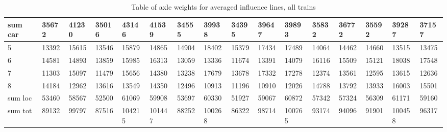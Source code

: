 \begin{table}[h]
\begin{adjustbox}{center}
\begin{tabularx}{0.95\pagewidth}{ |X|X|X|X|X|X|X|X|X|X|X|X|X|X|X|X| }
      \hline
      sum car  & 35672   &   41230   &    35016   &    43146   &    41539    &   34555  &     39938    &   34395   &    39647   &    39893   &    35832   &    36772    &   35592   &   39287    &    37157  \\
      \hline
      5 & 13392   &   15615   &    13546   &    15879   &    14865    &   14904  &     18402    &   15379   &    17434   &    17489   &    14064   &    14462    &   14660   &   13515    &    13475  \\
      \hline
      6 & 14581   &   14893   &    13859   &    15985   &    16313    &   13059  &     13336    &   11674   &    13391   &    14079   &    16116   &    15509    &   15121   &   18038    &    17548  \\
      \hline
      7 & 11303   &   15097   &    11479   &    15656   &    14380    &   13238  &     17679    &   13678   &    17332   &    17278   &    12374   &    13561    &   12595   &   13615    &    12636  \\
      \hline
      8 & 14184   &   12962   &    13616   &    13549   &    14350    &   12496  &     10913    &   11196   &    10910   &    12026   &    14788   &    13792    &   13933   &   16003    &    15501  \\
      \hline
      sum loc & 53460   &   58567   &    52500   &    61069   &    59908    &   53697  &     60330    &   51927   &    59067   &    60872   &    57342   &    57324    &   56309   &   61171    &    59160  \\
      \hline
      sum tot & 89132   &   99797   &    87516   &   104215   &   101447    &   88252  &    100268    &   86322   &    98714   &   100765   &    93174   &    94096    &   91901   &   100458   &    96317  \\
      \hline
    \end{tabularx}
  \end{adjustbox}
  \caption{Table of axle weights for averaged influence lines, all trains}
  \label{table:all_trains_all sensors}
\end{table}




